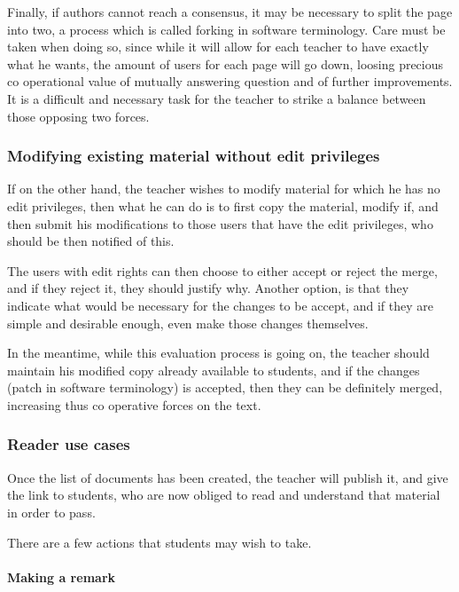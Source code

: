 \documentclass[12pt]{article}
\begin{document}
Finally, if authors cannot reach a consensus, it may be necessary to split the page into two, a process which is called forking in software terminology. Care must be taken when doing so, since while it will allow for each teacher to have exactly what he wants, the amount of users for each page will go down, loosing precious co operational value of mutually answering question and of further improvements. It is a difficult and necessary task for the teacher to strike a balance between those opposing two forces.

\subsubsection{Modifying existing material without edit privileges}

If on the other hand, the teacher wishes to modify material for which he has no edit privileges, then what he can do is to first copy the material, modify if, and then submit his modifications to those users that have the edit privileges, who should be then notified of this.

The users with edit rights can then choose to either accept or reject the merge, and if they reject it, they should justify why. Another option, is that they indicate what would be necessary for the changes to be accept, and if they are simple and desirable enough, even make those changes themselves.

In the meantime, while this evaluation process is going on, the teacher should maintain his modified copy already available to students, and if the changes (patch in software terminology) is accepted, then they can be definitely merged, increasing thus co operative forces on the text.

\subsubsection{Reader use cases} \label{reader-use-cases}

Once the list of documents has been created, the teacher will publish it, and give the link to students, who are now obliged to read and understand that material in order to pass.

There are a few actions that students may wish to take.

\paragraph{Making a remark} \label{make-a-remark}
\end{document}
